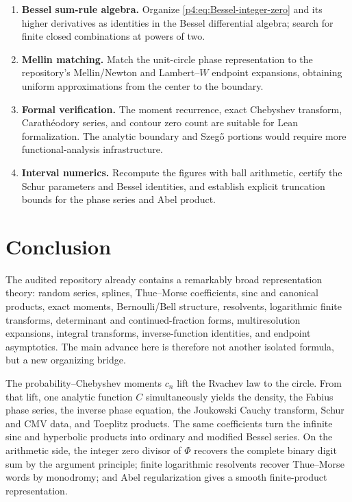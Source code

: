 \documentclass[11pt,oneside]{article}
\theoremstyle{definition}
\begin{document}
\begin{enumerate}
\item \textbf{Bessel sum-rule algebra.} Organize \eqref{p4:eq:Bessel-integer-zero} and its
higher derivatives as identities in the Bessel differential algebra; search for finite
closed combinations at powers of two.

\item \textbf{Mellin matching.} Match the unit-circle phase representation to the repository's
Mellin/Newton and Lambert--\(W\) endpoint expansions, obtaining uniform approximations from
the center to the boundary.

\item \textbf{Formal verification.} The moment recurrence, exact Chebyshev transform,
Carath\'eodory series, and contour zero count are suitable for Lean formalization. The
analytic boundary and Szeg\H{o} portions would require more functional-analysis
infrastructure.

\item \textbf{Interval numerics.} Recompute the figures with ball arithmetic, certify the
Schur parameters and Bessel identities, and establish explicit truncation bounds for the
phase series and Abel product.
\end{enumerate}

\section{Conclusion}
\label{p4:sec:conclusion}

The audited repository already contains a remarkably broad representation theory: random
series, splines, Thue--Morse coefficients, sinc and canonical products, exact moments,
Bernoulli/Bell structure, resolvents, logarithmic finite transforms, determinant and
continued-fraction forms, multiresolution expansions, integral transforms, inverse-function
identities, and endpoint asymptotics. The main advance here is therefore not another
isolated formula, but a new organizing bridge.

The probability--Chebyshev moments \(c_n\) lift the Rvachev law to the circle. From that lift,
one analytic function \(C\) simultaneously yields the density, the Fabius phase series, the
inverse phase equation, the Joukowski Cauchy transform, Schur and CMV data, and Toeplitz
products. The same coefficients turn the infinite sinc and hyperbolic products into ordinary
and modified Bessel series. On the arithmetic side, the integer zero divisor of \(\Phi\)
recovers the complete binary digit sum by the argument principle; finite logarithmic
resolvents recover Thue--Morse words by monodromy; and Abel regularization gives a smooth
finite-product representation.
\end{document}
